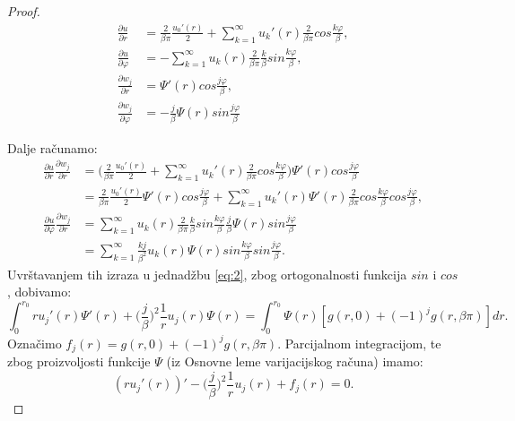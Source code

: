 \documentclass[a4paper,oneside,12pt]{memoir} %
\begin{document}
\begin{proof}
\begin{align*}
\frac{\partial u}{\partial r} &= \frac{2}{\beta \pi} \frac{u_0'(r)}{2} + \sum_{k = 1}^{\infty} u_k'(r) \frac{2}{\beta \pi} cos \frac{k \varphi}{\beta}, \\
\frac{\partial u}{\partial \varphi} &= - \sum_{k = 1}^{\infty} u_k(r) \frac{2}{\beta \pi} \frac{k}{\beta} sin \frac{k \varphi}{\beta}, \\
\frac{\partial w_j}{\partial r} &= \Psi '(r) cos \frac{j \varphi}{\beta}, \\
\frac{\partial w_j}{\partial \varphi} &= - \frac{j}{\beta} \Psi (r) sin \frac{j \varphi}{\beta}
\end{align*}

Dalje računamo:
\begin{align*}
\frac{\partial u}{\partial r} \frac{\partial w_j}{\partial r} &= \Big( \frac{2}{\beta \pi} \frac{u_0'(r)}{2} + \sum_{k = 1}^{\infty} u_k'(r) \frac{2}{\beta \pi} cos \frac{k \varphi}{\beta} \Big) \Psi '(r) cos \frac{j \varphi}{\beta} \\
&= \frac{2}{\beta \pi} \frac{u_0'(r)}{2} \Psi '(r) cos \frac{j \varphi}{\beta} + \sum_{k = 1}^{\infty} u_k'(r) \Psi '(r) \frac{2}{\beta \pi} cos \frac{k \varphi}{\beta} cos \frac{j \varphi}{\beta}, \\
\frac{\partial u}{\partial \varphi} \frac{\partial w_j}{\partial r} &= \sum_{k = 1}^{\infty} u_k(r) \frac{2}{\beta \pi} \frac{k}{\beta} sin \frac{k \varphi}{\beta} \frac{j}{\beta} \Psi (r) sin \frac{j \varphi}{\beta} \\
&= \sum_{k = 1}^{\infty} \frac{k j}{\beta^2} u_k(r) \Psi (r) sin \frac{k \varphi}{\beta} sin \frac{j \varphi}{\beta}.
\end{align*}
Uvrštavanjem tih izraza u jednadžbu \ref{eq:2}, zbog ortogonalnosti funkcija $sin$ i $cos$, dobivamo:
\begin{equation*}
\int_0^{r_0} r u_j'(r) \Psi'(r) + \Big(\frac{j}{\beta} \Big)^2 \frac{1}{r} u_j(r) \Psi(r) = \int_0^{r_0} \Psi(r) [g(r,0) + (-1)^j g(r, \beta \pi)] dr.
\end{equation*}
Označimo $f_j(r) = g(r,0) + (-1)^j g(r, \beta \pi)$.
Parcijalnom integracijom, te zbog proizvoljosti funkcije $\Psi$ (iz Osnovne leme varijacijskog računa) imamo:
\begin{equation} \label{eq:3}
(r u_j'(r))' - \Big(\frac{j}{\beta} \Big)^2 \frac{1}{r} u_j(r) + f_j(r) = 0.
\end{equation}


\end{proof}
\end{document}
